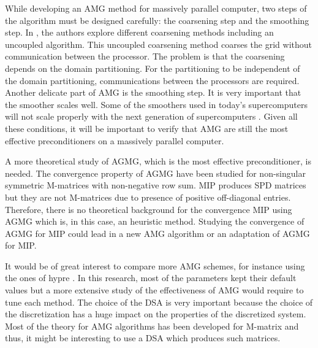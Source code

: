 \begin{long_description}
    While developing an AMG method for massively parallel computer, two steps
    of the algorithm must be designed carefully: the coarsening step and the
    smoothing step. In \cite{mis}, the authors explore different coarsening
    methods including an uncoupled algorithm. This uncoupled coarsening method
    coarses the grid without communication between the processor. The problem
    is that the coarsening depends on the domain partitioning. For the
    partitioning to be independent of the domain partitioning, communications
    between the processors are required. Another delicate part of AMG is the
    smoothing step. It is very important that the smoother scales well. Some
    of the smoothers used in today's supercomputers will not scale properly
    with the next generation of supercomputers \cite{amg_parallel}. Given all
    these conditions, it will be important to verify that AMG are still the
    most effective preconditioners on a massively parallel computer.
  \item[Convergence study of AGMG for MIP and development of AMG for MIP:] A 
    more theoretical study of AGMG, which is the most effective preconditioner, 
    is needed. The convergence property of AGMG have been studied for non-singular 
    symmetric M-matrices with non-negative row sum. MIP produces SPD matrices
    but they are not M-matrices due to presence of positive off-diagonal
    entries. Therefore, there is no theoretical background for the convergence 
    MIP using AGMG which is, in this case, an heuristic method. Studying the 
    convergence of AGMG for MIP could lead in a new AMG algorithm or an adaptation 
    of AGMG for MIP.
  \item[Comparison of different AMG methods:] It would be of great interest 
    to compare more AMG schemes, for instance using the ones of hypre 
    \cite{hypre_guide}. In this research, most of the parameters kept their 
    default values but a more extensive study of the effectiveness of AMG 
    would require to tune each method. The choice of the DSA is very important 
    because the choice of the discretization has a huge impact on the properties 
    of the discretized system. Most of the theory for AMG algorithms has been 
    developed for M-matrix and thus, it might be interesting to use a DSA
    which produces such matrices.
\end{long_description}
